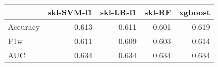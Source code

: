 \begin{tabular}{lrrrr}
\toprule
{} &  skl-SVM-l1 &  skl-LR-l1 &  skl-RF &  xgboost \\
\midrule
Accuracy &       0.613 &      0.611 &   0.601 &    0.619 \\
F1w      &       0.611 &      0.609 &   0.603 &    0.614 \\
AUC      &       0.634 &      0.634 &   0.634 &    0.634 \\
\bottomrule
\end{tabular}

